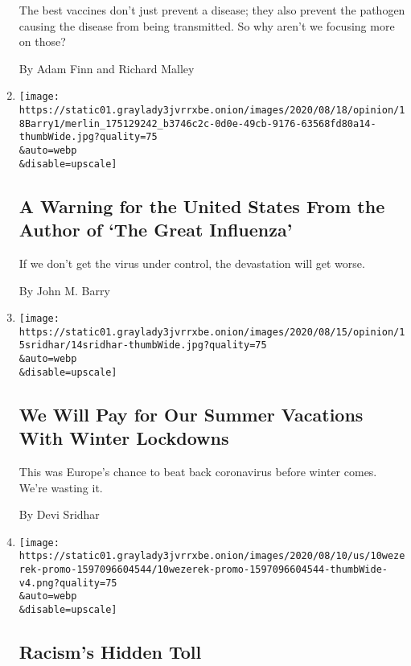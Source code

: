 \begin{enumerate}
  The best vaccines don't just prevent a disease; they also prevent the
  pathogen causing the disease from being transmitted. So why aren't we
  focusing more on those?

  By Adam Finn and Richard Malley
\item
  \href{/2020/08/18/opinion/coronavirus-economy.html}{}

  \texttt{[image: https://static01.graylady3jvrrxbe.onion/images/2020/08/18/opinion/18Barry1/merlin\_175129242\_b3746c2c-0d0e-49cb-9176-63568fd80a14-thumbWide.jpg?quality=75\\\&auto=webp\\\&disable=upscale]}

  \hypertarget{a-warning-for-the-united-states-from-the-author-of-the-great-influenza}{%
  \subsection{A Warning for the United States From the Author of `The
  Great
  Influenza'}\label{a-warning-for-the-united-states-from-the-author-of-the-great-influenza}}

  If we don't get the virus under control, the devastation will get
  worse.

  By John M. Barry
\item
  \href{/2020/08/14/opinion/coronavirus-europe-vacation.html}{}

  \texttt{[image: https://static01.graylady3jvrrxbe.onion/images/2020/08/15/opinion/15sridhar/14sridhar-thumbWide.jpg?quality=75\\\&auto=webp\\\&disable=upscale]}

  \hypertarget{we-will-pay-for-our-summer-vacations-with-winter-lockdowns}{%
  \subsection{We Will Pay for Our Summer Vacations With Winter
  Lockdowns}\label{we-will-pay-for-our-summer-vacations-with-winter-lockdowns}}

  This was Europe's chance to beat back coronavirus before winter comes.
  We're wasting it.

  By Devi Sridhar
\item
  \href{/interactive/2020/08/11/opinion/us-coronavirus-black-mortality.html}{}

  \texttt{[image: https://static01.graylady3jvrrxbe.onion/images/2020/08/10/us/10wezerek-promo-1597096604544/10wezerek-promo-1597096604544-thumbWide-v4.png?quality=75\\\&auto=webp\\\&disable=upscale]}

  \hypertarget{racisms-hidden-toll}{%
  \subsection{Racism's Hidden Toll}\label{racisms-hidden-toll}}


\end{enumerate}
